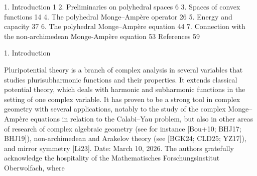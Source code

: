 \documentclass[
  11pt,
]{article}
\newenvironment{Shaded}{}{}
\newcommand{\NormalTok}[1]{#1}
\begin{document}
\begin{Shaded}
\begin{Highlighting}[]
\NormalTok{                                            1.   Introduction                                                                                                 1}
\NormalTok{                                            2.   Preliminaries on polyhedral spaces                                                                           6}
\NormalTok{                                            3.   Spaces of convex functions                                                                                  14}
\NormalTok{                                            4.   The polyhedral Monge–Ampère operator                                                                       26}
\NormalTok{                                            5.   Energy and capacity                                                                                         37}
\NormalTok{                                            6.   The polyhedral Monge–Ampère equation                                                                       44}
\NormalTok{                                            7.   Connection with the non{-}archimedean Monge{-}Ampère equation                                                  53}
\NormalTok{                                            References                                                                                                       59}



\NormalTok{                                                                                          1. Introduction}

\NormalTok{                                             Pluripotential theory is a branch of complex analysis in several variables that studies}
\NormalTok{                                          plurisubharmonic functions and their properties. It extends classical potential theory, which deals}
\NormalTok{                                          with harmonic and subharmonic functions in the setting of one complex variable. It has proven to}
\NormalTok{                                          be a strong tool in complex geometry with several applications, notably to the study of the complex}
\NormalTok{                                          Monge–Ampère equations in relation to the Calabi–Yau problem, but also in other areas of research}
\NormalTok{                                          of complex algebraic geometry (see for instance [Bou+10; BHJ17; BHJ19]), non{-}archimedean and}
\NormalTok{                                          Arakelov theory (see [BGK24; CLD25; YZ17]), and mirror symmetry [Li23].}
\NormalTok{                                             Date: March 10, 2026.}
\NormalTok{                                             The authors gratefully acknowledge the hospitality of the Mathematisches Forschungsinstitut Oberwolfach, where}
\end{Highlighting}
\end{Shaded}
\end{document}
